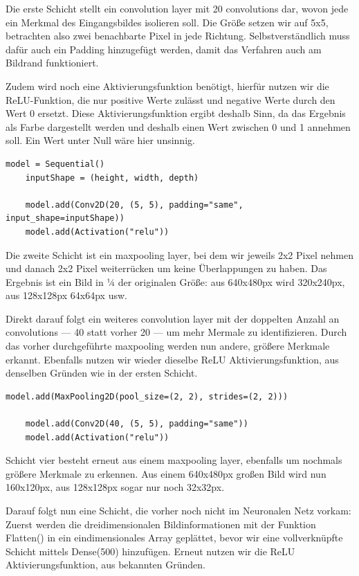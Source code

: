 \documentclass[conference]{IEEEtran}
\begin{document}
Die erste Schicht stellt ein convolution layer mit 20 convolutions dar, wovon jede ein Merkmal des Eingangsbildes isolieren soll.
Die Größe setzen wir auf 5x5, betrachten also zwei benachbarte Pixel in jede Richtung.
Selbstverständlich muss dafür auch ein Padding hinzugefügt werden, damit das Verfahren auch am Bildrand funktioniert. 

Zudem wird noch eine Aktivierungsfunktion benötigt, hierfür nutzen wir die ReLU-Funktion, die nur positive Werte zulässt und negative Werte durch den Wert 0 ersetzt.
Diese Aktivierungsfunktion ergibt deshalb Sinn, da das Ergebnis als Farbe dargestellt werden und deshalb einen Wert zwischen 0 und 1 annehmen soll.
Ein Wert unter Null wäre hier unsinnig.

\begin{lstlisting}[label={list:model_1_1},caption=Sequentielles Modell und erste Schicht]
	model = Sequential()
	inputShape = (height, width, depth)

	model.add(Conv2D(20, (5, 5), padding="same", input_shape=inputShape))
	model.add(Activation("relu"))
\end{lstlisting}

Die zweite Schicht ist ein maxpooling layer, bei dem wir jeweils 2x2 Pixel nehmen und danach 2x2 Pixel weiterrücken um keine Überlappungen zu haben.
Das Ergebnis ist ein Bild in ¼ der originalen Größe: aus 640x480px wird 320x240px, aus 128x128px 64x64px usw.

Direkt darauf folgt ein weiteres convolution layer mit der doppelten Anzahl an convolutions — 40 statt vorher 20 — um mehr Mermale zu identifizieren.
Durch das vorher durchgeführte maxpooling werden nun andere, größere Merkmale erkannt.
Ebenfalls nutzen wir wieder dieselbe ReLU Aktivierungsfunktion, aus denselben Gründen wie in der ersten Schicht.

\begin{lstlisting}[label={list:model_1_2},caption=Modell: zweite und dritte Schicht]
	model.add(MaxPooling2D(pool_size=(2, 2), strides=(2, 2)))

	model.add(Conv2D(40, (5, 5), padding="same"))
	model.add(Activation("relu"))
\end{lstlisting}

Schicht vier besteht erneut aus einem maxpooling layer, ebenfalls um nochmals größere Merkmale zu erkennen.
Aus einem 640x480px großen Bild wird nun 160x120px, aus 128x128px sogar nur noch 32x32px.

Darauf folgt nun eine Schicht, die vorher noch nicht im Neuronalen Netz vorkam:
Zuerst werden die dreidimensionalen Bildinformationen mit der Funktion Flatten() in ein eindimensionales Array geplättet, bevor wir eine vollverknüpfte Schicht mittels Dense(500) hinzufügen.
Erneut nutzen wir die ReLU Aktivierungsfunktion, aus bekannten Gründen.
\end{document}
